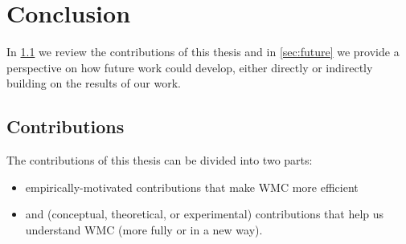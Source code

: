 \chapter{Conclusion}\label{chapter:conclusion}

In \cref{sec:contributions} we review the contributions of this thesis and in
\cref{sec:future} we provide a perspective on how future work could develop,
either directly or indirectly building on the results of our work.

\section{Contributions}\label{sec:contributions}


The contributions of this thesis can be divided into two parts:
\begin{itemize}
  \item empirically-motivated contributions that make WMC more efficient
  \item and (conceptual, theoretical, or experimental) contributions that help
        us understand WMC (more fully or in a new way).
\end{itemize}


